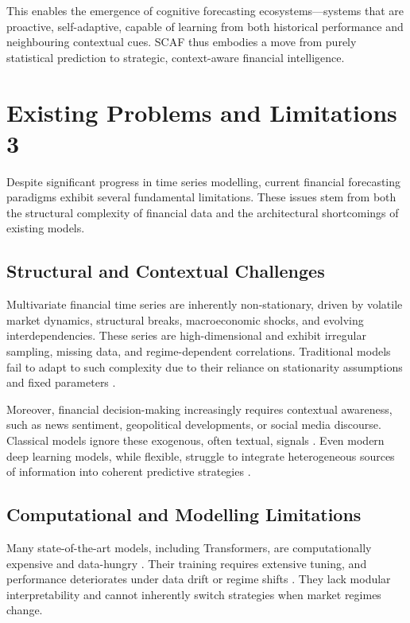 \documentclass[conference]{IEEEtran}
\begin{document}
This enables the emergence of cognitive forecasting ecosystems—systems that are proactive, self-adaptive, capable of learning from both historical performance and neighbouring contextual cues. SCAF thus embodies a move from purely statistical prediction to strategic, context-aware financial intelligence.

\section{Existing Problems and Limitations 3}

Despite significant progress in time series modelling, current financial forecasting paradigms exhibit several fundamental limitations. These issues stem from both the structural complexity of financial data and the architectural shortcomings of existing models.

\subsection{Structural and Contextual Challenges}
Multivariate financial time series are inherently non-stationary, driven by volatile market dynamics, structural breaks, macroeconomic shocks, and evolving interdependencies. These series are high-dimensional and exhibit irregular sampling, missing data, and regime-dependent correlations. Traditional models fail to adapt to such complexity due to their reliance on stationarity assumptions and fixed parameters \cite{bai1998bai, bollerslev1986garch, stock1999structural}.

Moreover, financial decision-making increasingly requires contextual awareness, such as news sentiment, geopolitical developments, or social media discourse. Classical models ignore these exogenous, often textual, signals \cite{tetlock2007giving, loughran2011liability}. Even modern deep learning models, while flexible, struggle to integrate heterogeneous sources of information into coherent predictive strategies \cite{zhang2021deep}.

\subsection{Computational and Modelling Limitations}
Many state-of-the-art models, including Transformers, are computationally expensive and data-hungry \cite{li2023efficientformer}. Their training requires extensive tuning, and performance deteriorates under data drift or regime shifts \cite{fischer2018deep, nie2023patchtst}. They lack modular interpretability and cannot inherently switch strategies when market regimes change.
\end{document}
